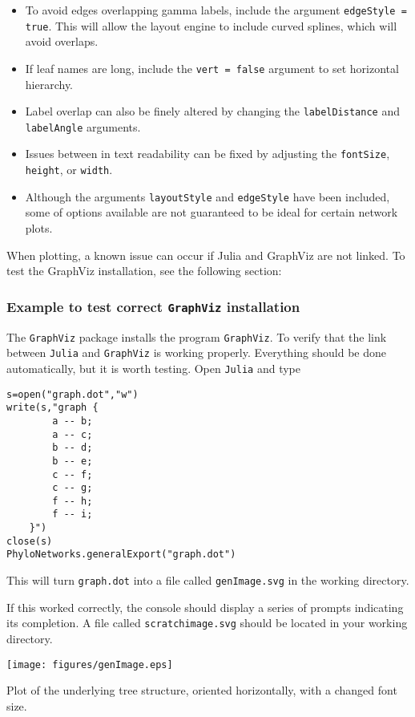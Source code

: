 \documentclass[12pt]{article}
\begin{document}
\begin{itemize}
\item To avoid edges overlapping gamma labels, include the argument \texttt{edgeStyle = true}. This will allow the layout engine to include curved splines, which will avoid overlaps.
\item If leaf names are long, include the \texttt{vert = false} argument to set horizontal hierarchy.
\item Label overlap can also be finely altered by changing the \texttt{labelDistance} and \texttt{labelAngle} arguments.
\item Issues between in text readability can be fixed by adjusting the \texttt{fontSize}, \texttt{height}, or \texttt{width}.
\item Although the arguments \texttt{layoutStyle} and \texttt{edgeStyle} have been included,
  some of options available are not guaranteed to be ideal for certain network plots.
\end{itemize}

When plotting, a known issue can occur if Julia and GraphViz are not
linked. To test the GraphViz installation, see the following section:

\subsubsection{Example to test correct \texttt{GraphViz} installation}

The \texttt{GraphViz} package installs the program
\texttt{GraphViz}. To verify that the link between \texttt{Julia} and
\texttt{GraphViz} is working properly. Everything should be done
automatically, but it is worth testing.  Open \texttt{Julia} and type
\begin{lstlisting}
s=open("graph.dot","w")
write(s,"graph {
		a -- b;
		a -- c;
		b -- d;
		b -- e;
		c -- f;
		c -- g;
        f -- h;
        f -- i;
	}")
close(s)
PhyloNetworks.generalExport("graph.dot")
\end{lstlisting}
This will turn
\texttt{graph.dot} into a file called \texttt{genImage.svg} in the
working directory.

\noindent If this worked correctly, the console should display a series of prompts indicating its completion.
A file called \texttt{scratchimage.svg} should be located in your working directory.

\begin{center}
  \texttt{[image: figures/genImage.eps]}
\end{center}
Plot of the underlying tree structure, oriented horizontally, with a changed font size.
\end{document}
